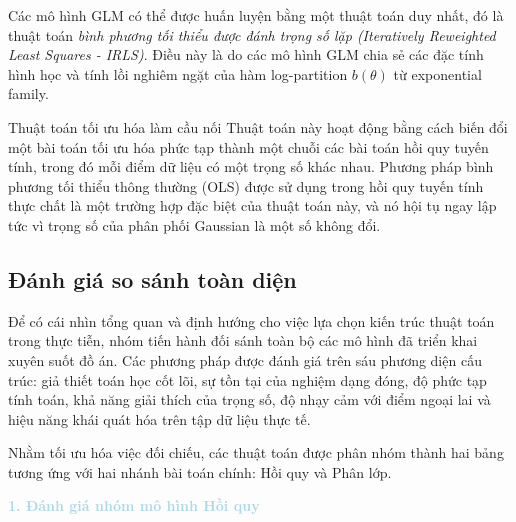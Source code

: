 Các mô hình GLM có thể được huấn luyện bằng một thuật toán duy nhất, đó là thuật toán \textit{bình phương tối thiểu được đánh trọng số lặp (Iteratively Reweighted Least Squares - IRLS)}. Điều này là do các mô hình GLM chia sẻ các đặc tính hình học và tính lồi nghiêm ngặt của hàm log-partition $b(\theta)$ từ exponential family.

\begin{infobox}{Thuật toán tối ưu hóa làm cầu nối}
Thuật toán này hoạt động bằng cách biến đổi một bài toán tối ưu hóa phức tạp thành một chuỗi các bài toán hồi quy tuyến tính, trong đó mỗi điểm dữ liệu có một trọng số khác nhau. Phương pháp bình phương tối thiểu thông thường (OLS) được sử dụng trong hồi quy tuyến tính thực chất là một trường hợp đặc biệt của thuật toán này, và nó hội tụ ngay lập tức vì trọng số của phân phối Gaussian là một số không đổi.
\end{infobox}

\subsection{Đánh giá so sánh toàn diện}

Để có cái nhìn tổng quan và định hướng cho việc lựa chọn kiến trúc thuật toán trong thực tiễn, nhóm tiến hành đối sánh toàn bộ các mô hình đã triển khai xuyên suốt đồ án. Các phương pháp được đánh giá trên sáu phương diện cấu trúc: giả thiết toán học cốt lõi, sự tồn tại của nghiệm dạng đóng, độ phức tạp tính toán, khả năng giải thích của trọng số, độ nhạy cảm với điểm ngoại lai và hiệu năng khái quát hóa trên tập dữ liệu thực tế.

Nhằm tối ưu hóa việc đối chiếu, các thuật toán được phân nhóm thành hai bảng tương ứng với hai nhánh bài toán chính: Hồi quy và Phân lớp.

\vspace{0.5em}
\noindent\textcolor{lightblue}{\textbf{1. Đánh giá nhóm mô hình Hồi quy}}
\vspace{0.5em}

